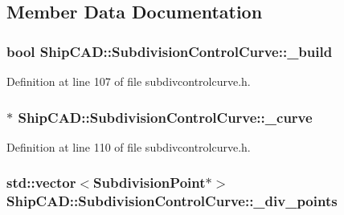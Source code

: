 \subsection{Member Data Documentation}
\hypertarget{classShipCAD_1_1SubdivisionControlCurve_a1e4dd9968f46becb714e44709d0da418}{
\subsubsection[{\-\_\-build}]{\setlength{\rightskip}{0pt plus 5cm}bool Ship\-C\-A\-D\-::\-Subdivision\-Control\-Curve\-::\-\_\-build\hspace{0.3cm}{\ttfamily [protected]}}}\label{classShipCAD_1_1SubdivisionControlCurve_a1e4dd9968f46becb714e44709d0da418}


Definition at line 107 of file subdivcontrolcurve.\-h.

\hypertarget{classShipCAD_1_1SubdivisionControlCurve_a115a5b67ed81a3012ccb02a25b3d2c24}{
\subsubsection[{\-\_\-curve}]{$\ast$ Ship\-C\-A\-D\-::\-Subdivision\-Control\-Curve\-::\-\_\-curve\hspace{0.3cm}{\ttfamily [protected]}}}\label{classShipCAD_1_1SubdivisionControlCurve_a115a5b67ed81a3012ccb02a25b3d2c24}


Definition at line 110 of file subdivcontrolcurve.\-h.

\hypertarget{classShipCAD_1_1SubdivisionControlCurve_af91dbc96b703fe618567326cca21d82c}{
\subsubsection[{\-\_\-div\-\_\-points}]{\setlength{\rightskip}{0pt plus 5cm}std\-::vector$<${\bf Subdivision\-Point}$\ast$$>$ Ship\-C\-A\-D\-::\-Subdivision\-Control\-Curve\-::\-\_\-div\-\_\-points\hspace{0.3cm}{\ttfamily [protected]}}}\label{classShipCAD_1_1SubdivisionControlCurve_af91dbc96b703fe618567326cca21d82c}


